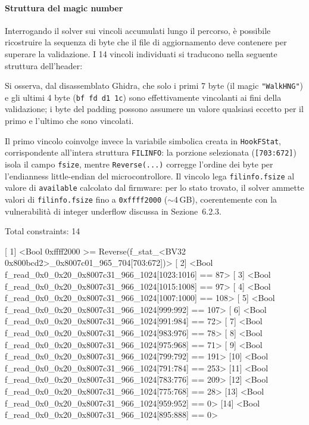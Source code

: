        \paragraph{Struttura del magic number}
        
        Interrogando il solver sui vincoli accumulati lungo il percorso, è 
        possibile ricostruire la sequenza di byte che il file di aggiornamento 
        deve contenere per superare la validazione. I 14 vincoli individuati si 
        traducono nella seguente struttura dell'header:
        
        
        
        Si osserva, dal disassemblato Ghidra, che solo i primi 7 byte (il magic 
        \texttt{"WalkHNG"}) e gli ultimi 4 byte (\texttt{bf fd d1 1c}) sono 
        effettivamente vincolanti ai fini della validazione; i byte del padding 
        possono assumere un valore qualsiasi eccetto per il primo e l'ultimo che sono vincolati.
        
        Il primo vincolo coinvolge invece la variabile simbolica creata in 
        \texttt{HookFStat}, corrispondente all'intera struttura 
        \texttt{FILINFO}: la porzione selezionata (\texttt{[703:672]}) isola il 
        campo \texttt{fsize}, mentre \texttt{Reverse(...)} corregge l'ordine 
        dei byte per l'endianness little-endian del microcontrollore. Il 
        vincolo lega \texttt{filinfo.fsize} al valore di \texttt{available} 
        calcolato dal firmware: per lo stato trovato, il solver ammette valori 
        di \texttt{filinfo.fsize} fino a \texttt{0xffff2000} ($\sim$4\,GB), 
        coerentemente con la vulnerabilità di integer underflow discussa in 
        Sezione~6.2.3.

\begin{bashcode}
Total constraints: 14

  [ 1] <Bool 0xffff2000 >= Reverse(f_stat_<BV32 0x800bcd2>_0x8007c01_965_704[703:672])>
  [ 2] <Bool f_read_0x0_0x20_0x8007c31_966_1024[1023:1016] == 87>
  [ 3] <Bool f_read_0x0_0x20_0x8007c31_966_1024[1015:1008] == 97>
  [ 4] <Bool f_read_0x0_0x20_0x8007c31_966_1024[1007:1000] == 108>
  [ 5] <Bool f_read_0x0_0x20_0x8007c31_966_1024[999:992] == 107>
  [ 6] <Bool f_read_0x0_0x20_0x8007c31_966_1024[991:984] == 72>
  [ 7] <Bool f_read_0x0_0x20_0x8007c31_966_1024[983:976] == 78>
  [ 8] <Bool f_read_0x0_0x20_0x8007c31_966_1024[975:968] == 71>
  [ 9] <Bool f_read_0x0_0x20_0x8007c31_966_1024[799:792] == 191>
  [10] <Bool f_read_0x0_0x20_0x8007c31_966_1024[791:784] == 253>
  [11] <Bool f_read_0x0_0x20_0x8007c31_966_1024[783:776] == 209>
  [12] <Bool f_read_0x0_0x20_0x8007c31_966_1024[775:768] == 28>
  [13] <Bool f_read_0x0_0x20_0x8007c31_966_1024[959:952] == 0>
  [14] <Bool f_read_0x0_0x20_0x8007c31_966_1024[895:888] == 0>
\end{bashcode}


